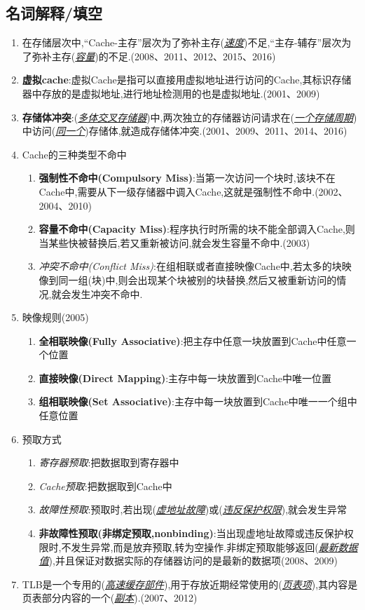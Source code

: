 \documentclass[a4paper]{ctexart}
\newcommand{\blank}[1]{(\emph{\underline{#1}})}
\begin{document}
\subsection{名词解释/填空}
\begin{enumerate}
  \item 在存储层次中,“Cache-主存”层次为了弥补主存\blank{速度}不足,“主存-辅存”层次为了弥补主存\blank{容量}的不足.(2008、2011、2012、2015、2016)
  \item \textbf{虚拟cache}:虚拟Cache是指可以直接用虚拟地址进行访问的Cache,其标识存储器中存放的是虚拟地址,进行地址检测用的也是虚拟地址.(2001、2009)
  \item \textbf{存储体冲突}:\blank{多体交叉存储器}中,两次独立的存储器访问请求在\blank{一个存储周期}中访问\blank{同一个}存储体,就造成存储体冲突.(2001、2009、2011、2014、2016)
  \item Cache的三种类型不命中
  \begin{enumerate}
    \item \textbf{强制性不命中(Compulsory Miss)}:当第一次访问一个块时,该块不在Cache中,需要从下一级存储器中调入Cache,这就是强制性不命中.(2002、2004、2010)
    \item \textbf{容量不命中(Capacity Miss)}:程序执行时所需的块不能全部调入Cache,则当某些快被替换后,若又重新被访问,就会发生容量不命中.(2003)
    \item \emph{冲突不命中(Conflict Miss)}:在组相联或者直接映像Cache中,若太多的块映像到同一组(块)中,则会出现某个块被别的块替换,然后又被重新访问的情况,就会发生冲突不命中.
  \end{enumerate}
  \item 映像规则(2005)
  \begin{enumerate}
    \item \textbf{全相联映像(Fully Associative)}:把主存中任意一块放置到Cache中任意一个位置
    \item \textbf{直接映像(Direct Mapping)}:主存中每一块放置到Cache中唯一位置
    \item \textbf{组相联映像(Set Associative)}:主存中每一块放置到Cache中唯一一个组中任意位置
  \end{enumerate}
  \item 预取方式
  \begin{enumerate}
    \item \emph{寄存器预取}:把数据取到寄存器中
    \item \emph{Cache预取}:把数据取到Cache中
    \item \emph{故障性预取}:预取时,若出现\blank{虚地址故障}或\blank{违反保护权限},就会发生异常
    \item \textbf{非故障性预取(非绑定预取,nonbinding)}:当出现虚地址故障或违反保护权限时,不发生异常,而是放弃预取,转为空操作.非绑定预取能够返回\blank{最新数据值},并且保证对数据实际的存储器访问的是最新的数据项(2008、2009)
  \end{enumerate}
  \item TLB是一个专用的(\emph{\underline{高速缓存部件}}),用于存放近期经常使用的(\emph{\underline{页表项}}),其内容是页表部分内容的一个(\emph{\underline{副本}}).(2007、2012)
\end{enumerate}
\end{document}
